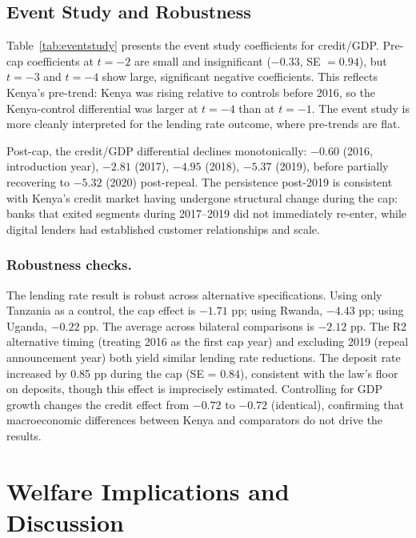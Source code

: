 \documentclass[12pt]{article}
\begin{document}


\subsection{Event Study and Robustness}

Table~\ref{tab:eventstudy} presents the event study coefficients for credit/GDP. Pre-cap coefficients at $t=-2$ are small and insignificant ($-0.33$, SE $= 0.94$), but $t=-3$ and $t=-4$ show large, significant negative coefficients. This reflects Kenya's pre-trend: Kenya was rising relative to controls before 2016, so the Kenya-control differential was larger at $t=-4$ than at $t=-1$. The event study is more cleanly interpreted for the lending rate outcome, where pre-trends are flat.

Post-cap, the credit/GDP differential declines monotonically: $-0.60$ (2016, introduction year), $-2.81$ (2017), $-4.95$ (2018), $-5.37$ (2019), before partially recovering to $-5.32$ (2020) post-repeal. The persistence post-2019 is consistent with Kenya's credit market having undergone structural change during the cap: banks that exited segments during 2017--2019 did not immediately re-enter, while digital lenders had established customer relationships and scale.



\subsubsection*{Robustness checks.}
The lending rate result is robust across alternative specifications. Using only Tanzania as a control, the cap effect is $-1.71$ pp; using Rwanda, $-4.43$ pp; using Uganda, $-0.22$ pp. The average across bilateral comparisons is $-2.12$ pp. The R2 alternative timing (treating 2016 as the first cap year) and excluding 2019 (repeal announcement year) both yield similar lending rate reductions. The deposit rate increased by 0.85 pp during the cap (SE = 0.84), consistent with the law's floor on deposits, though this effect is imprecisely estimated. Controlling for GDP growth changes the credit effect from $-0.72$ to $-0.72$ (identical), confirming that macroeconomic differences between Kenya and comparators do not drive the results.

\section{Welfare Implications and Discussion}
\end{document}
